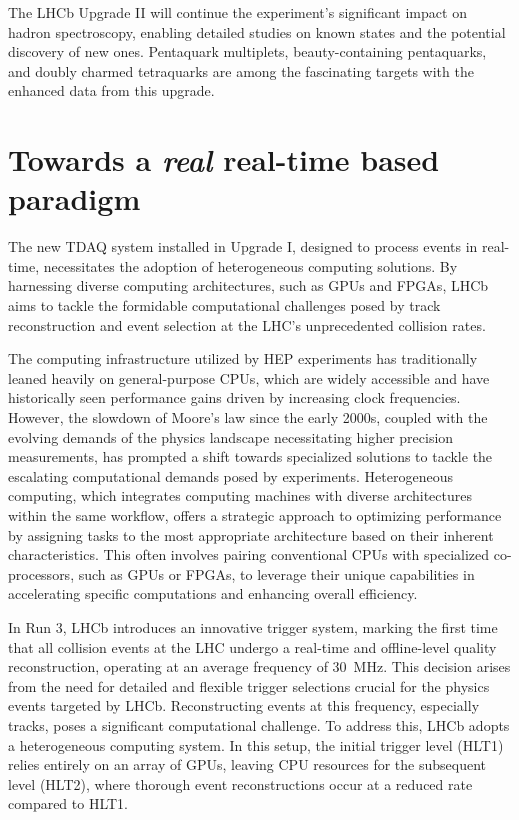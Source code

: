 The LHCb Upgrade II will continue the experiment's significant impact on hadron spectroscopy, enabling detailed studies on known states and the potential discovery of new ones. Pentaquark multiplets, beauty-containing pentaquarks, and doubly charmed tetraquarks are among the fascinating targets with the enhanced data from this upgrade.



\section{Towards a \textit{real} real-time based paradigm}
The new TDAQ system installed in Upgrade I, designed to process events in real-time, necessitates the adoption of heterogeneous computing solutions. By harnessing diverse computing architectures, such as GPUs and FPGAs, LHCb aims to tackle the formidable computational challenges posed by track reconstruction and event selection at the LHC's unprecedented collision rates.

The computing infrastructure utilized by HEP experiments has traditionally leaned heavily on general-purpose CPUs, which are widely accessible and have historically seen performance gains driven by increasing clock frequencies. However, the slowdown of Moore's law since the early 2000s, coupled with the evolving demands of the physics landscape necessitating higher precision measurements, has prompted a shift towards specialized solutions to tackle the escalating computational demands posed by experiments. Heterogeneous computing, which integrates computing machines with diverse architectures within the same workflow, offers a strategic approach to optimizing performance by assigning tasks to the most appropriate architecture based on their inherent characteristics. This often involves pairing conventional CPUs with specialized co-processors, such as GPUs or FPGAs, to leverage their unique capabilities in accelerating specific computations and enhancing overall efficiency.

In Run 3, LHCb introduces an innovative trigger system, marking the first time that all collision events at the LHC undergo a real-time and offline-level quality reconstruction, operating at an average frequency of \SI{30}{\mega\hertz}. This decision arises from the need for detailed and flexible trigger selections crucial for the physics events targeted by LHCb. Reconstructing events at this frequency, especially tracks, poses a significant computational challenge. To address this, LHCb adopts a heterogeneous computing system. In this setup, the initial trigger level (HLT1) relies entirely on an array of GPUs, leaving CPU resources for the subsequent level (HLT2), where thorough event reconstructions occur at a reduced rate compared to HLT1. 

